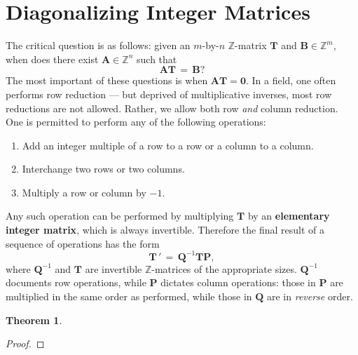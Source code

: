 \documentclass[11pt]{article}
\newtheorem{theorem}{Theorem}
\renewcommand{\vec}[1]{\mathbf{#1}}
\newcommand{\mat}[1]{\mathbf{#1}}
\begin{document}



%


\section{Diagonalizing Integer Matrices}

The critical question is as follows: given an $m$-by-$n$ $\mathbb{Z}$-matrix $\mat{T}$ and $\vec{B} \in \mathbb{Z}^{m}$, when does there exist $\vec{A} \in \mathbb{Z}^{n}$ such that
\[
  \vec{A} \mat{T} \, = \, \vec{B}?
\]
The most important of these questions is when $\vec{A} \mat{T} = \vec{0}$. In a field, one often performs row reduction --- but deprived of multiplicative inverses, most row reductions are not allowed. Rather, we allow both row \textit{and} column reduction. One is permitted to perform any of the following operations:
\begin{enumerate}
  \item Add an integer multiple of a row to a row or a column to a column.
  \item Interchange two rows or two columns.
  \item Multiply a row or column by $-1$.
\end{enumerate}

Any such operation can be performed by multiplying $\mat{T}$ by an \textbf{elementary integer matrix}, which is always invertible. Therefore the final result of a sequence of operations has the form
\[
  \mat{T} \, ' \, = \, \mat{Q}^{-1} \mat{T} \mat{P},
\]
where $\mat{Q}^{-1}$ and $\mat{T}$ are invertible $\mathbb{Z}$-matrices of the appropriate sizes. $\mat{Q}^{-1}$ documents row operations, while $\mat{P}$ dictates column operations: those in $\mat{P}$ are multiplied in the same order as performed, while those in $\mat{Q}$ are in \textit{reverse} order.

\begin{adjustwidth}{0.5cm}{}
  \begin{theorem}
    
  \end{theorem}
  \begin{proof}
    
  \end{proof}
\end{adjustwidth}

\end{document}
